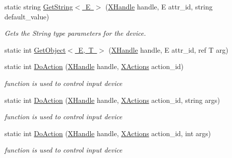 \begin{DoxyCompactItemize}
static string \mbox{\hyperlink{class_ximmerse_1_1_input_system_1_1_x_device_plugin_a702aba317928dbf9028591a54a8c91be}{Get\+String$<$ E $>$}} (\mbox{\hyperlink{class_ximmerse_1_1_input_system_1_1_x_device_plugin_1_1_x_handle}{X\+Handle}} handle, E attr\+\_\+id, string default\+\_\+value)
\begin{DoxyCompactList}\small\item\em Gets the String type parameters for the device. \end{DoxyCompactList}\item 
static int \mbox{\hyperlink{class_ximmerse_1_1_input_system_1_1_x_device_plugin_abdee83621541ceeb6ca0d971eadf1ed6}{Get\+Object$<$ E, T $>$}} (\mbox{\hyperlink{class_ximmerse_1_1_input_system_1_1_x_device_plugin_1_1_x_handle}{X\+Handle}} handle, E attr\+\_\+id, ref T arg)
\item 
static int \mbox{\hyperlink{class_ximmerse_1_1_input_system_1_1_x_device_plugin_a40272546ecacaef98c2c013ca1485742}{Do\+Action}} (\mbox{\hyperlink{class_ximmerse_1_1_input_system_1_1_x_device_plugin_1_1_x_handle}{X\+Handle}} handle, \mbox{\hyperlink{class_ximmerse_1_1_input_system_1_1_x_device_plugin_ab7f817a86e5b3af956089fb089b7d0c3}{X\+Actions}} action\+\_\+id)
\begin{DoxyCompactList}\small\item\em function is used to control input device \end{DoxyCompactList}\item 
static int \mbox{\hyperlink{class_ximmerse_1_1_input_system_1_1_x_device_plugin_aaa4ab5e91e8c12c593430a35a71f8f08}{Do\+Action}} (\mbox{\hyperlink{class_ximmerse_1_1_input_system_1_1_x_device_plugin_1_1_x_handle}{X\+Handle}} handle, \mbox{\hyperlink{class_ximmerse_1_1_input_system_1_1_x_device_plugin_ab7f817a86e5b3af956089fb089b7d0c3}{X\+Actions}} action\+\_\+id, string args)
\begin{DoxyCompactList}\small\item\em function is used to control input device \end{DoxyCompactList}\item 
static int \mbox{\hyperlink{class_ximmerse_1_1_input_system_1_1_x_device_plugin_a783d80ba255be3580dfbc08ab0e9e327}{Do\+Action}} (\mbox{\hyperlink{class_ximmerse_1_1_input_system_1_1_x_device_plugin_1_1_x_handle}{X\+Handle}} handle, \mbox{\hyperlink{class_ximmerse_1_1_input_system_1_1_x_device_plugin_ab7f817a86e5b3af956089fb089b7d0c3}{X\+Actions}} action\+\_\+id, int args)
\begin{DoxyCompactList}\small\item\em function is used to control input device \end{DoxyCompactList}\item 

\end{DoxyCompactItemize}
